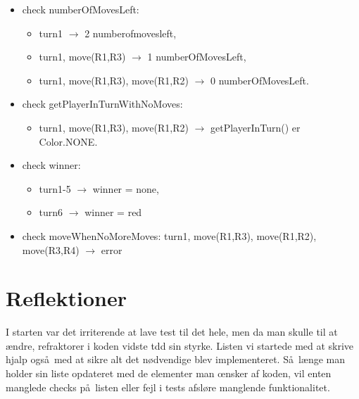 \documentclass[a4paper]{article}
\begin{document}
\begin{itemize}
\item check numberOfMovesLeft: 
  \begin{itemize}
  \item turn1 $\rightarrow$ 2 numberofmovesleft,

  \item turn1, move(R1,R3) $\rightarrow$ 1 numberOfMovesLeft,

  \item turn1, move(R1,R3), move(R1,R2) $\rightarrow$ 0 numberOfMovesLeft.

  \end{itemize}


\item check getPlayerInTurnWithNoMoves: 
  \begin{itemize}
  \item turn1, move(R1,R3), move(R1,R2) $\rightarrow$ getPlayerInTurn() er Color.NONE.

  \end{itemize}
\item check winner:
  \begin{itemize}
  \item  turn1-5 $\rightarrow$ winner = none,

  \item turn6 $\rightarrow$ winner = red
  \end{itemize}


\item check moveWhenNoMoreMoves: turn1, move(R1,R3), move(R1,R2), move(R3,R4) $\rightarrow$ error


\end{itemize}

\section{Reflektioner}

I starten var det irriterende at lave test til det hele, men da man
skulle til at \ae ndre, refraktorer i koden vidste tdd sin
styrke. Listen vi startede med at skrive hjalp ogs\aa\ med at sikre
alt det n\o dvendige blev implementeret. S\aa\ l\ae nge man holder sin
liste opdateret med de elementer man \oe nsker af koden, vil enten
manglede checks p\aa\ listen eller fejl i tests afsl\o re manglende funktionalitet.
\end{document}
